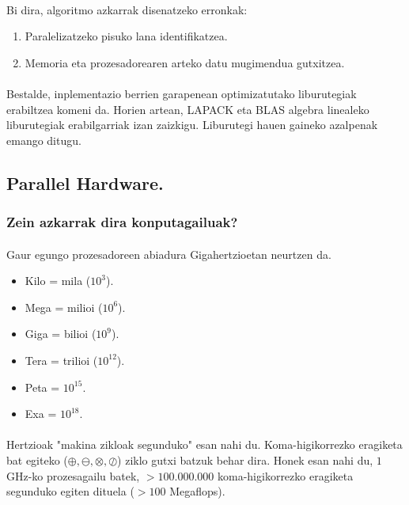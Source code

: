 \paragraph*{}Bi dira, algoritmo azkarrak disenatzeko erronkak: 
\begin{enumerate}
\item Paralelizatzeko pisuko lana identifikatzea.
\item Memoria eta prozesadorearen arteko datu mugimendua gutxitzea. 
\end{enumerate}

\paragraph*{}Bestalde, inplementazio berrien garapenean optimizatutako liburutegiak erabiltzea komeni da. Horien artean, LAPACK eta BLAS algebra linealeko liburutegiak erabilgarriak izan zaizkigu. Liburutegi hauen gaineko azalpenak emango ditugu.

\subsection{Parallel Hardware.}

\subsubsection*{\textbf{Zein azkarrak dira konputagailuak?}}

\paragraph*{}Gaur egungo prozesadoreen abiadura Gigahertzioetan neurtzen da. 

\begin{itemize}
\item Kilo = mila ($10^3$).
\item Mega = milioi ($10^6$).
\item Giga = bilioi ($10^9$).
\item Tera = trilioi ($10^{12}$).
\item Peta = $10^{15}$.
\item Exa = $10^{18}$. 
\end{itemize}

\paragraph*{} Hertzioak "makina zikloak segunduko" esan nahi du. Koma-higikorrezko  eragiketa bat egiteko ($\oplus,\ominus,\otimes,\oslash$) ziklo gutxi batzuk behar dira. Honek esan nahi du, $1$GHz-ko prozesagailu batek,
$>100.000.000$ koma-higikorrezko eragiketa segunduko egiten dituela ($>100$ Megaflops).

